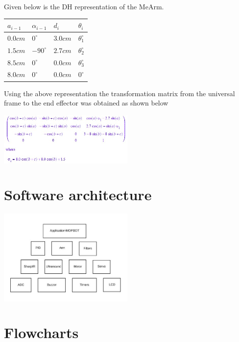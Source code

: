 \documentclass[12pt]{article}
\begin{document}
Given below is the DH representation of the MeArm.

\begin{center}
\begin{tabular}{ |p{0.9cm}|p{0.7cm}|p{0.9cm}|p{0.3cm}|}
\hline
 $a_{i-1}$ & $\alpha_{i-1}$ & $d_{i}$ & $\theta_{i}$ \\
\hline
$0.0 cm$ & $0^{\circ}$ & $3.0 cm$ & $\theta_{1}^{\circ}$ \\
\hline
$1.5 cm$ & $-90^{\circ}$ & $2.7 cm$ & $\theta_{2}^{\circ}$ \\
\hline
$8.5 cm$ & $0^{\circ}$ & $0.0 cm$ & $\theta_{3}^{\circ}$ \\
\hline
$8.0 cm$ & $0^{\circ}$ & $0.0 cm$ & $0^{\circ}$ \\
\hline
\end{tabular}
\end{center}

\noindent Using the above representation the transformation matrix from the universal frame to the end effector was obtained as shown below

\begin{center}
\includegraphics[width=0.5\textwidth]{5.jpg}
\end{center}

\part{Software architecture}

\begin{center}
\includegraphics[width=0.5\textwidth]{6.jpg}
\end{center}

\part{Flowcharts}
\end{document}
